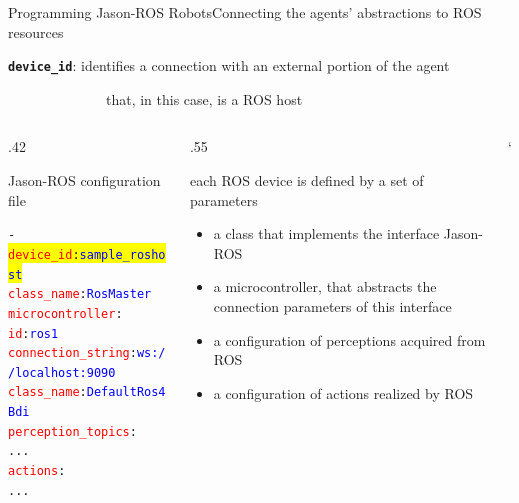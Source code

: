 \documentclass[compress]{beamer}
\newcommand{\yamlkey}[1]{\textcolor{red}{\texttt{#1}}}
\newcommand{\yamlvalue}[1]{\textcolor{blue}{\texttt{#1}}}
\begin{document}
\begin{frame}[fragile]{Programming Jason-ROS Robots}{Connecting the agents' abstractions to ROS resources}

    \footnotesize
    \texttt{{\bf device\_id}}: identifies a connection with an external portion of the agent\\ 
    
    \vspace{-.5cm}
    
    \ \ \ \ \ \ \ \ \ \ \ \ \ \ {\tiny that, in this case, is a ROS host}

    
    \begin{columns}
       \begin{column}{.42\textwidth}      
            \begin{block}{{\scriptsize Jason-ROS configuration file}}
                \scriptsize
                \begin{alltt} \tiny
- \colorbox{yellow}{\yamlkey{device\_id}: \yamlvalue{sample\_roshost}}
  \yamlkey{class_name}: \yamlvalue{RosMaster}
  \yamlkey{microcontroller}: 
    \yamlkey{id}: \yamlvalue{ros1} 
    \yamlkey{connection_string}: \yamlvalue{ws://localhost:9090} 
    \yamlkey{class_name}: \yamlvalue{DefaultRos4Bdi}
  \yamlkey{perception_topics}:         
    ...
  \yamlkey{actions}:       
    ...
                \end{alltt}

            \end{block}    
        \end{column}
        
        \hspace{-25pt} %
  
        \begin{column}{.55\textwidth} \scriptsize
  
            each ROS device is defined by a set of parameters
            \begin{itemize}\tiny
                \item a class that implements the interface Jason-ROS
                \item a microcontroller, that abstracts the connection parameters of this interface
                \item a configuration of perceptions acquired from ROS
                \item a configuration of actions realized by ROS
            \end{itemize}
        \end{column}`      
    \end{columns}
  

\end{frame}
\end{document}
